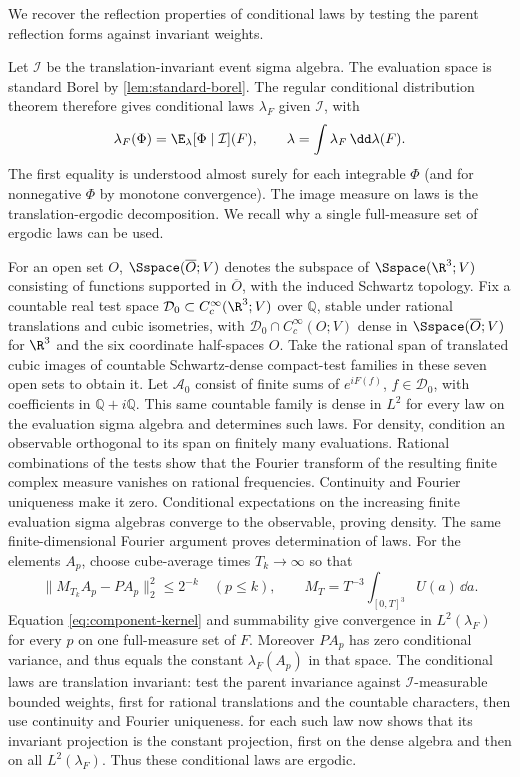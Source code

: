 We recover the reflection properties of conditional laws by
testing the parent reflection forms against invariant weights.

Let $\mathcal I$ be the translation-invariant event sigma algebra.
The evaluation space is standard Borel by \cref{lem:standard-borel}.
The regular conditional distribution theorem
\cite[Theorems~4.1.16--4.1.17]{Durrett2019} therefore gives conditional laws $\lambda_F$ given $\mathcal I$, with
\begin{equation}\label{eq:component-kernel}
 \lambda_F(\Phi)=\E_\lambda[\Phi\mid\mathcal I](F),\qquad
 \lambda=\int\lambda_F\,\dd\lambda(F).
\end{equation}
The first equality is understood almost surely for each integrable
$\Phi$ (and for nonnegative $\Phi$ by monotone convergence).
The image measure on laws is the translation-ergodic decomposition.
We recall why a single full-measure set of ergodic laws can be used.

For an open set $O$, $\Sspace(\overline O;V)$ denotes
the subspace of $\Sspace(\R^3;V)$ consisting of functions
supported in $\overline O$, with the induced Schwartz topology.
Fix a countable real test space $\mathcal D_0\subset C_c^\infty(\R^3;V)$
over $\mathbb Q$, stable under rational translations and cubic
isometries, with $\mathcal D_0\cap C_c^\infty(O;V)$ dense
in $\Sspace(\overline O;V)$ for $\R^3$ and the six coordinate
half-spaces $O$. Take the rational span of translated cubic images
of countable Schwartz-dense compact-test families in these seven
open sets to obtain it.
Let $\mathcal A_0$ consist of finite sums of $e^{iF(f)}$,
$f\in\mathcal D_0$, with coefficients in $\mathbb Q+i\mathbb Q$.
This same countable family is dense in $L^2$ for every law on the
evaluation sigma algebra and determines such laws. For density,
condition an observable orthogonal to its span on finitely many
evaluations. Rational combinations of the tests show that the
Fourier transform of the resulting finite complex measure vanishes
on rational frequencies. Continuity and Fourier uniqueness make it
zero. Conditional expectations on the increasing finite evaluation
sigma algebras converge to the observable, proving density.
The same finite-dimensional Fourier argument proves determination
of laws. For the elements
$A_p$, choose cube-average times $T_k\to\infty$ so that
\[
 \|M_{T_k}A_p-PA_p\|_2^2\le2^{-k}\quad(p\le k),\qquad
 M_T=T^{-3}\int_{[0,T]^3}U(a)\,\dd a.
\]
Equation \eqref{eq:component-kernel} and summability give convergence
in $L^2(\lambda_F)$ for every $p$ on one full-measure set of $F$.
Moreover $PA_p$ has zero conditional variance, and thus equals
the constant $\lambda_F(A_p)$ in that space. The conditional laws
are translation invariant: test the parent invariance against
$\mathcal I$-measurable bounded weights, first for rational
translations and the countable characters, then use continuity and
Fourier uniqueness.  for each such law now
shows that its invariant projection is the constant projection,
first on the dense algebra and then on all $L^2(\lambda_F)$.
Thus these conditional laws are ergodic.

